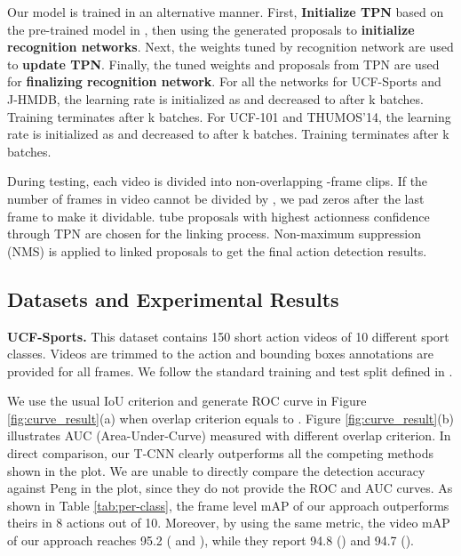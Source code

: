 \documentclass[10pt,twocolumn,letterpaper]{article}
\begin{document}
 Our model is trained in an alternative manner. First, \textbf {Initialize TPN} based on the pre-trained model in \cite{c3d}, then using the generated proposals to \textbf{initialize recognition networks}. Next, the weights tuned by recognition network are used to \textbf{update TPN}. Finally, the tuned weights and proposals from TPN are used for \textbf{finalizing recognition network}. For all the networks for UCF-Sports and J-HMDB, the learning rate is initialized as  and decreased to  after k batches. Training terminates after k batches. For UCF-101 and THUMOS'14, the learning rate is initialized as  and decreased to  after k batches. Training terminates after k batches.

During testing, each video is divided into non-overlapping -frame clips. If the number of frames in video cannot be divided by , we pad zeros after the last frame to make it dividable.  tube proposals with highest actionness confidence through TPN are chosen for the linking process. Non-maximum suppression (NMS) is applied to linked proposals to get the final action detection results.

\subsection{Datasets and Experimental Results}
\label{subsec:results}

\textbf{UCF-Sports.} This dataset contains 150 short action videos of 10 different sport classes. Videos are trimmed to the action and bounding boxes annotations are provided for all frames.
We follow the standard training and test split defined in \cite{lan2011discriminative}.

We use the usual IoU criterion and generate ROC curve in Figure \ref{fig:curve_result}(a) when overlap criterion equals to . Figure \ref{fig:curve_result}(b) illustrates AUC (Area-Under-Curve) measured with different overlap criterion. In direct comparison, our T-CNN clearly outperforms all the competing methods shown in the plot. We are unable to directly compare the detection accuracy against Peng \etal \cite{2stream-rcnn_peng:hal-01349107} in the plot, since they do not provide the ROC and AUC curves. As shown in Table \ref{tab:per-class}, the frame level mAP of our approach outperforms theirs in 8 actions out of 10. Moreover, by using the same metric, the video mAP of our approach reaches 95.2 ( and ), while they report 94.8 () and 94.7 ().
\end{document}
